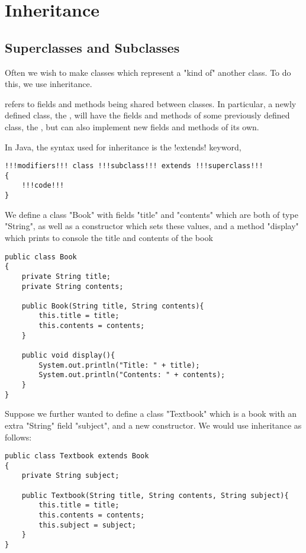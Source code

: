 \documentclass[11pt]{report}
\begin{document}
\section{Inheritance}
\subsection{Superclasses and Subclasses}
Often we wish to make classes which represent a "kind of" another class. To do this, we use inheritance.
\begin{defi}[Inheritance]
 refers to fields and methods being shared between classes. In particular, a newly defined class, the , will have the fields and methods of some previously defined class, the , but can also implement new fields and methods of its own.
\end{defi} 
\noindent In Java, the syntax used for inheritance is the \inlineJava!extends! keyword, 
\vspace{-20pt}
\begin{lstlisting}[style=javaSyntax]
!!!modifiers!!! class !!!subclass!!! extends !!!superclass!!!
{
    !!!code!!!
}
\end{lstlisting}
\begin{eg}
    We define a class \inlineJava"Book" with fields \inlineJava"title" and \inlineJava"contents" which are both of type \inlineJava"String", as well as a constructor which sets these values, and a method \inlineJava"display" which prints to console the title and contents of the book
\begin{lstlisting}[caption=Book,label=lst:Book]
public class Book
{
    private String title;
    private String contents;

    public Book(String title, String contents){
        this.title = title;
        this.contents = contents;
    }

    public void display(){
        System.out.println("Title: " + title);
        System.out.println("Contents: " + contents);
    }
}
\end{lstlisting}
Suppose we further wanted to define a class \inlineJava"Textbook" which is a book with an extra \inlineJava"String" field \inlineJava"subject", and a new constructor. We would use inheritance as follows:
\pagebreak
\begin{lstlisting}[caption = Textbook, label=lst:Textbook1]
public class Textbook extends Book
{
    private String subject;

    public Textbook(String title, String contents, String subject){
        this.title = title;
        this.contents = contents;
        this.subject = subject;
    }
}
\end{lstlisting}
\end{eg}
\end{document}

